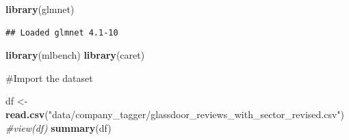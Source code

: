 \documentclass[
]{article}
\newenvironment{Shaded}{\begin{snugshade}}{\end{snugshade}}
\newcommand{\CommentTok}[1]{\textcolor[rgb]{0.56,0.35,0.01}{\textit{#1}}}
\newcommand{\FunctionTok}[1]{\textcolor[rgb]{0.13,0.29,0.53}{\textbf{#1}}}
\newcommand{\NormalTok}[1]{#1}
\newcommand{\OtherTok}[1]{\textcolor[rgb]{0.56,0.35,0.01}{#1}}
\newcommand{\StringTok}[1]{\textcolor[rgb]{0.31,0.60,0.02}{#1}}
\begin{document}
\begin{Shaded}
\begin{Highlighting}[]
\FunctionTok{library}\NormalTok{(glmnet)}
\end{Highlighting}
\end{Shaded}

\begin{verbatim}
## Loaded glmnet 4.1-10
\end{verbatim}

\begin{Shaded}
\begin{Highlighting}[]
\FunctionTok{library}\NormalTok{(mlbench)}
\FunctionTok{library}\NormalTok{(caret)}
\end{Highlighting}
\end{Shaded}

\#Import the dataset

\begin{Shaded}
\begin{Highlighting}[]
\NormalTok{df }\OtherTok{\textless{}{-}} \FunctionTok{read.csv}\NormalTok{(}\StringTok{"data/company\_tagger/glassdoor\_reviews\_with\_sector\_revised.csv"}\NormalTok{)}
\CommentTok{\#view(df)}
\FunctionTok{summary}\NormalTok{(df)}
\end{Highlighting}
\end{Shaded}
\end{document}
